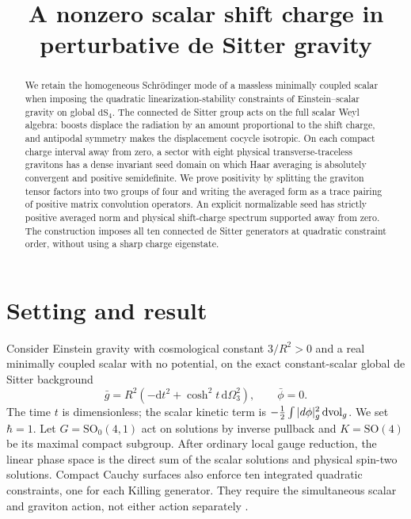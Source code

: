 \documentclass[11pt]{article}
\title{A nonzero scalar shift charge in perturbative de Sitter gravity}
\author{}
\date{}
\newcommand{\SO}{\mathrm{SO}}
\newcommand{\dd}{\,\mathrm d}
\numberwithin{equation}{section}
\begin{document}
\maketitle
\begin{abstract}
We retain the homogeneous Schr\"odinger mode of a massless minimally
coupled scalar when imposing the quadratic linearization-stability
constraints of Einstein--scalar gravity on global \(\mathrm{dS}_4\).
The connected de Sitter group acts on the full scalar Weyl algebra:
boosts displace the radiation by an amount proportional to the shift
charge, and antipodal symmetry makes the displacement cocycle isotropic.
On each compact charge interval away from zero, a sector with eight
physical transverse-traceless gravitons has a dense invariant seed
domain on which Haar averaging is absolutely convergent and positive
semidefinite. We prove positivity by splitting the graviton tensor
factors into two groups of four and writing the averaged form as a
trace pairing of positive matrix convolution operators. An explicit
normalizable seed has strictly positive averaged norm and physical
shift-charge spectrum supported away from zero. The construction
imposes all ten connected de Sitter generators at quadratic
constraint order, without using a sharp charge eigenstate.
\end{abstract}

\section{Setting and result}

Consider Einstein gravity with cosmological constant \(3/R^2>0\)
and a real minimally coupled scalar with no potential, on the exact
constant-scalar global de Sitter background
\[
 \bar g=R^2(-\mathrm dt^2+\cosh^2t\,\mathrm d\Omega_3^2),
 \qquad \bar\phi=0 .
\]
The time \(t\) is dimensionless; the scalar kinetic term is
\(-\tfrac12\int |d\phi|_g^2\dd{\rm vol}_g\). We set \(\hbar=1\).
Let \(G=\SO_0(4,1)\) act on solutions by inverse pullback and
\(K=\SO(4)\) be its maximal compact subgroup. After ordinary local
gauge reduction, the linear phase space is the direct sum of the
scalar solutions and physical spin-two solutions. Compact Cauchy
surfaces also enforce ten integrated quadratic constraints, one for
each Killing generator. They require the simultaneous scalar and
graviton action, not either action separately
\cite{higuchi,higuchiii,mmfree,my}.
\end{document}
